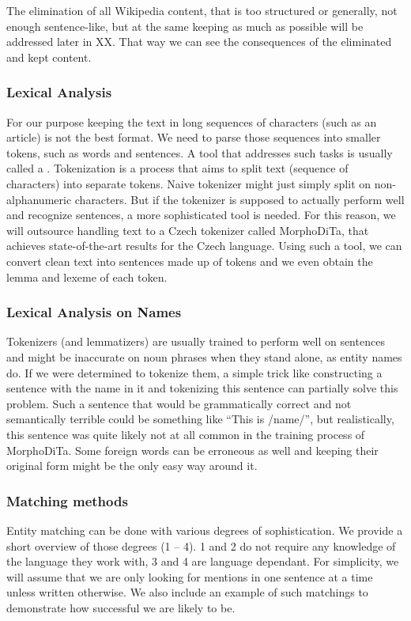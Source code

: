 The elimination of all Wikipedia content, that is too structured or generally, not enough sentence-like, but at the same keeping as much as possible will be addressed later in XX. That way we can see the consequences of the eliminated and kept content.


\subsubsection{Lexical Analysis}
For our purpose keeping the text in long sequences of characters (such as an article) is not the best format. We need to parse those sequences into smaller tokens, such as words and sentences. A tool that addresses such tasks is usually called a .
Tokenization is a process that aims to split text (sequence of characters) into separate tokens. Naive tokenizer might just simply split on non-alphanumeric characters. But if the tokenizer is supposed to actually perform well and recognize sentences, a more sophisticated tool is needed. For this reason, we will outsource handling text to a Czech tokenizer called MorphoDiTa, that achieves state-of-the-art results for the Czech language.  Using such a tool, we can convert clean text into sentences made up of tokens and we even obtain the lemma and lexeme of each token.

\subsubsection{Lexical Analysis on Names}
Tokenizers (and lemmatizers) are usually trained to perform well on sentences and might be inaccurate on noun phrases when they stand alone, as entity names do. If we were determined to tokenize them, a simple trick like constructing a sentence with the name in it and tokenizing this sentence can partially solve this problem. Such a sentence that would be grammatically correct and not semantically terrible could be something like “This is /name/”, but realistically, this sentence was quite likely not at all common in the training process of MorphoDiTa. Some foreign words can be erroneous as well and keeping their original form might be the only easy way around it.

\subsubsection{Matching methods}
Entity matching can be done with various degrees of sophistication. We provide a short overview of those degrees (1 -- 4). 1 and 2 do not require any knowledge of the language they work with, 3 and 4 are language dependant. For simplicity, we will assume that we are only looking for mentions in one sentence at a time unless written otherwise. We also include an example of such matchings to demonstrate how successful we are likely to be.

